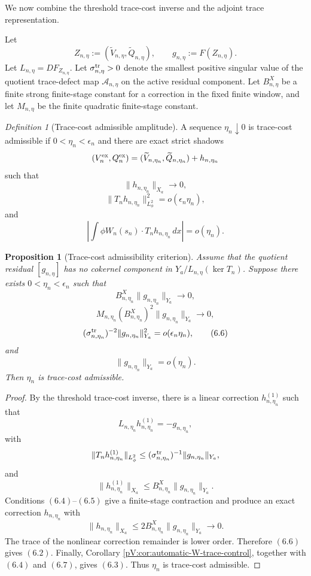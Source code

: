 \documentclass[11pt]{article}
\numberwithin{equation}{section}
\theoremstyle{plain}
\newtheorem{proposition}{Proposition}[section]
\theoremstyle{definition}
\theoremstyle{remark}
\newtheorem{definition}{Definition}[section]
\newcommand{\dx}{\,dx}
\begin{document}
We now combine the threshold trace-cost inverse and the adjoint trace representation.

Let
\[
        Z_{n,\eta}:=(\widetilde V_{n,\eta},\widetilde Q_{n,\eta}),
        \qquad
        g_{n,\eta}:=F(Z_{n,\eta}).
\]
Let \(L_{n,\eta}=DF_{Z_{n,\eta}}\).  Let \(\sigma^{\rm tr}_{n,\eta}>0\) denote the smallest positive singular value of the quotient trace-defect map \(\mathcal A_{n,\eta}\) on the active residual component.  Let \(B^X_{n,\eta}\) be a finite strong finite-stage constant for a correction in the fixed finite window, and let \(M_{n,\eta}\) be the finite quadratic finite-stage constant.

\begin{definition}[Trace-cost admissible amplitude]
\label{pV:def:trace-cost-admissible}
A sequence \(\eta_n\downarrow0\) is trace-cost admissible if \(0<\eta_n<\epsilon_n\) and there are exact strict shadows
\[
        (V_n^{\rm ex},Q_n^{\rm ex})
        =
        (\widetilde V_{n,\eta_n},\widetilde Q_{n,\eta_n})+h_{n,\eta_n}
\]
such that
\[
        \|h_{n,\eta_n}\|_{X_a}\to0,
        \tag{6.1}
\]
\[
        \|T_nh_{n,\eta_n}\|_{L^2_\phi}^2=o(\epsilon_n\eta_n),
        \tag{6.2}
\]
and
\[
        \left|
        \int\phi W_n(s_n)\cdot T_nh_{n,\eta_n}\dx
        \right|=o(\eta_n).
        \tag{6.3}
\]
\end{definition}

\begin{proposition}[Trace-cost admissibility criterion]
\label{pV:prop:trace-cost-admissibility}
Assume that the quotient residual \([g_{n,\eta}]\) has no cokernel component in
\(Y_a/L_{n,\eta}(\ker T_n)\).  Suppose there exists \(0<\eta_n<\epsilon_n\) such that
\[
        B^X_{n,\eta_n}\|g_{n,\eta_n}\|_{Y_a}\to0,
        \tag{6.4}
\]
\[
        M_{n,\eta_n}(B^X_{n,\eta_n})^2\|g_{n,\eta_n}\|_{Y_a}\to0,
        \tag{6.5}
\]
\[
        (\sigma^{\rm tr}_{n,\eta_n})^{-2}
        \|g_{n,\eta_n}\|_{Y_a}^2
        =o(\epsilon_n\eta_n),
        \tag{6.6}
\]
and
\[
        \|g_{n,\eta_n}\|_{Y_a}=o(\eta_n).
        \tag{6.7}
\]
Then \(\eta_n\) is trace-cost admissible.
\end{proposition}

\begin{proof}
By the threshold trace-cost inverse, there is a linear correction \(h^{(1)}_{n,\eta_n}\) such that
\[
        L_{n,\eta_n}h^{(1)}_{n,\eta_n}=-g_{n,\eta_n},
\]
with
\[
        \|T_nh^{(1)}_{n,\eta_n}\|_{L^2_\phi}
        \le
        (\sigma^{\rm tr}_{n,\eta_n})^{-1}\|g_{n,\eta_n}\|_{Y_a},
\]
and
\[
        \|h^{(1)}_{n,\eta_n}\|_{X_a}
        \le
        B^X_{n,\eta_n}\|g_{n,\eta_n}\|_{Y_a}.
\]
Conditions \((6.4)\)--\((6.5)\) give a finite-stage contraction and produce an exact correction \(h_{n,\eta_n}\) with
\[
        \|h_{n,\eta_n}\|_{X_a}
        \le
        2B^X_{n,\eta_n}\|g_{n,\eta_n}\|_{Y_a}\to0.
\]
The trace of the nonlinear correction remainder is lower order.  Therefore \((6.6)\) gives \((6.2)\).  Finally, Corollary \ref{pV:cor:automatic-W-trace-control}, together with \((6.4)\) and \((6.7)\), gives \((6.3)\).  Thus \(\eta_n\) is trace-cost admissible.
\end{proof}
\end{document}
